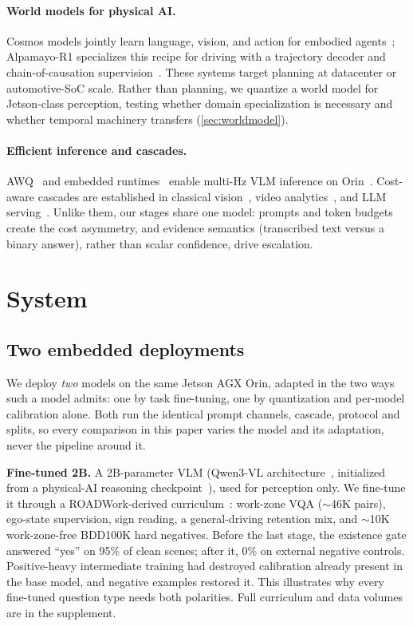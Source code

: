 \documentclass[10pt,twocolumn,letterpaper]{article}
\begin{document}
\paragraph{World models for physical AI.} Cosmos models jointly learn language, vision, and action for embodied agents~\cite{nvidia2025cosmosreason,nvidia2026cosmos3}; Alpamayo-R1 specializes this recipe for driving with a trajectory decoder and chain-of-causation supervision~\cite{alpamayo2026}.  These systems target planning at datacenter or automotive-SoC scale.  Rather than planning, we quantize a world model for Jetson-class perception, testing whether domain specialization is necessary and whether temporal machinery transfers (\cref{sec:worldmodel}).

\paragraph{Efficient inference and cascades.} AWQ~\cite{lin2024awq} and embedded runtimes~\cite{trtedgellm} enable multi-Hz VLM inference on Orin~\cite{chu2024mobilevlm,lin2024vila}.  Cost-aware cascades are established in classical vision~\cite{viola2001rapid}, video analytics~\cite{kang2017noscope}, and LLM serving~\cite{chen2023frugalgpt,gatekeeper2025}.  Unlike them, our stages share one model: prompts and token budgets create the cost asymmetry, and evidence semantics (transcribed text versus a binary answer), rather than scalar confidence, drive escalation.

\section{System}
\label{sec:system}

\subsection{Two embedded deployments}
\label{sec:deployment}

We deploy \emph{two} models on the same Jetson AGX Orin, adapted in the two ways such a model admits: one by task fine-tuning, one by quantization and per-model calibration alone.  Both run the identical prompt channels, cascade, protocol and splits, so every comparison in this paper varies the model and its adaptation, never the pipeline around it.

\textbf{Fine-tuned 2B.}  A 2B-parameter VLM (Qwen3-VL architecture~\cite{qwen3vl}, initialized from a physical-AI reasoning checkpoint~\cite{nvidia2025cosmosreason}), used for perception only.  We fine-tune it through a ROADWork-derived curriculum~\cite{ghosh2025roadwork}: work-zone VQA ($\sim$46K pairs), ego-state supervision, sign reading, a general-driving retention mix, and $\sim$10K work-zone-free BDD100K hard negatives.  Before the last stage, the existence gate answered ``yes'' on 95\% of clean scenes; after it, 0\% on external negative controls.  Positive-heavy intermediate training had destroyed calibration already present in the base model, and negative examples restored it.  This illustrates why every fine-tuned question type needs both polarities.  Full curriculum and data volumes are in the supplement.
\end{document}
